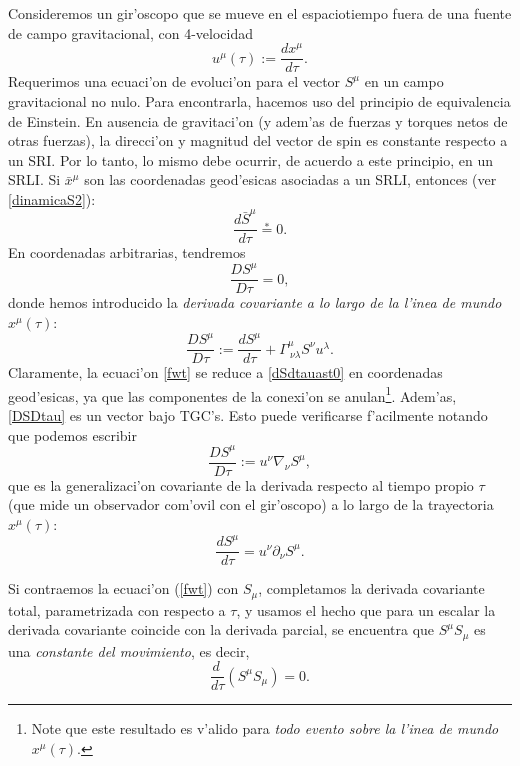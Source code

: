 Consideremos un gir'oscopo que se mueve en el espaciotiempo fuera de una fuente de campo gravitacional, con 4-velocidad
\begin{equation}
u^\mu (\tau):=\frac{dx^\mu }{d\tau}.
\end{equation}
Requerimos una ecuaci'on de evoluci'on para el vector $S^\mu$ en un campo gravitacional no nulo. Para encontrarla, hacemos uso del principio de equivalencia de Einstein. En ausencia de gravitaci'on (y adem'as de fuerzas y torques netos de otras fuerzas), la direcci'on y magnitud del vector de spin es constante respecto a un SRI. Por lo tanto, lo mismo debe ocurrir, de acuerdo a este principio, en un SRLI. Si $\bar{x}^\mu$ son las coordenadas geod'esicas asociadas a un SRLI, entonces (ver \eqref{dinamicaS2}): 
\begin{equation}\label{dSdtauast0}
\frac{d\bar{S}^\mu }{d\tau}\stackrel{*}{=}0.
\end{equation}
En coordenadas arbitrarias, tendremos
\begin{equation}\label{fwt}
\boxed{\frac{DS^\mu }{D\tau}=0,}
\end{equation}
donde hemos introducido la \textit{derivada covariante a lo largo de la l'inea de mundo $x^\mu(\tau)$}:
\begin{equation}\label{DSDtau}
\frac{DS^\mu}{D\tau}:=\frac{dS^\mu}{d\tau}+\Gamma^{\mu}_{\ \nu\lambda}S^\nu u^\lambda .
\end{equation}
Claramente, la ecuaci'on \eqref{fwt} se reduce a \eqref{dSdtauast0} en coordenadas geod'esicas, ya que las componentes de la conexi'on se anulan\footnote{Note que este resultado es v'alido para \textit{todo evento sobre la l'inea de mundo} $x^\mu(\tau)$.}. Adem'as, \eqref{DSDtau} es un vector bajo TGC's. Esto puede verificarse f'acilmente notando que podemos escribir
\begin{equation}
\frac{DS^\mu}{D\tau}:=u^\nu\nabla_\nu S^\mu,
\end{equation}
que es la generalizaci'on covariante de la derivada respecto al tiempo propio $\tau$ (que mide un observador com'ovil con el gir'oscopo) a lo largo de la trayectoria $x^\mu (\tau)$:
\begin{equation}
\frac{dS^\mu }{d\tau}=u^{\nu}\partial_{\nu} S^{\mu}.
\end{equation}

Si contraemos la ecuaci'on (\ref{fwt}) con $S_{\mu}$, completamos la derivada covariante total, parametrizada con respecto a $\tau$, y usamos el hecho que para un escalar la derivada covariante coincide con la derivada parcial, se encuentra que $S^\mu S_{\mu}$ es una \textit{constante del movimiento}, es decir,
\begin{equation}\boxed{
\frac{d\ }{d\tau}\left(S^\mu S_{\mu}\right)=0.}\label{SSconstante}
\end{equation}

